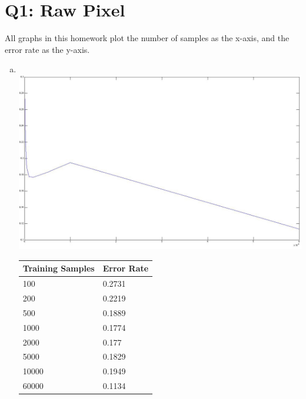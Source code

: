\documentclass[12pt]{article}
\begin{document}
\section*{Q1: Raw Pixel}
  All graphs in this homework plot the number of samples as the x-axis, and the 
  error rate as the y-axis.
  \begin{enumerate}[a.]
    \item \quad \\
      \includegraphics[scale=0.35]{q1_pixel_error.jpg}
      \begin{tabular}{l|l}
        \hline
        Training Samples & Error Rate \\
        \hline
        100   & 0.2731 \\
        200   & 0.2219 \\
        500   & 0.1889 \\
        1000  & 0.1774 \\
        2000  & 0.177  \\
        5000  & 0.1829 \\
        10000 & 0.1949 \\
        60000 & 0.1134 \\
      \end{tabular}
  \end{enumerate}
\newpage
\end{document}
